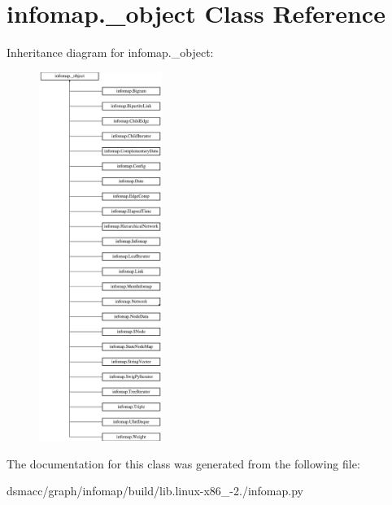 \hypertarget{classinfomap_1_1__object}{}\section{infomap.\+\_\+object Class Reference}
\label{classinfomap_1_1__object}
Inheritance diagram for infomap.\+\_\+object\+:\begin{figure}[H]
\begin{center}
\leavevmode
\includegraphics[height=12.000000cm]{classinfomap_1_1__object}
\end{center}
\end{figure}


The documentation for this class was generated from the following file\+:\begin{DoxyCompactItemize}
\item 
dsmacc/graph/infomap/build/lib.\+linux-\/x86\+\_-\/2./infomap.\+py\end{DoxyCompactItemize}
